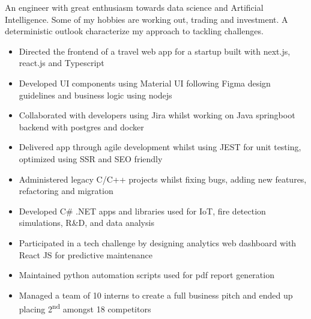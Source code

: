 \documentclass[11pt,a4paper,ragged2e]{altacv}
\begin{document}
\begin{paracol}{1}
\smallskip
{}

An engineer with great enthusiasm towards data science and Artificial Intelligence. Some of my hobbies are working out, trading and investment. A deterministic outlook characterize my approach to tackling challenges.\smallskip





\begin{itemize}
\item Directed the frontend of a travel web app for a startup built with next.js, react.js and Typescript
\item Developed UI components using Material UI following Figma design guidelines and business logic using nodejs
\item Collaborated with developers using Jira whilst working on Java springboot backend with postgres and docker
\item Delivered app through agile development whilst using JEST for unit testing, optimized using SSR and SEO friendly
\end{itemize}
\tightdivider

\begin{itemize}
\item Administered legacy C/C++ projects whilst fixing bugs, adding new features, refactoring and migration
\item Developed C\# .NET apps and libraries used for IoT, fire detection simulations, R\&D, and data analysis
\item Participated in a tech challenge by designing analytics web dashboard with React JS for predictive maintenance 
\item Maintained python automation scripts used for pdf report generation
\item Managed a team of 10 interns to create a full business pitch and ended up placing  2\textsuperscript{nd} amongst 18 competitors
\end{itemize}
\tightdivider


\end{paracol}
\end{document}
